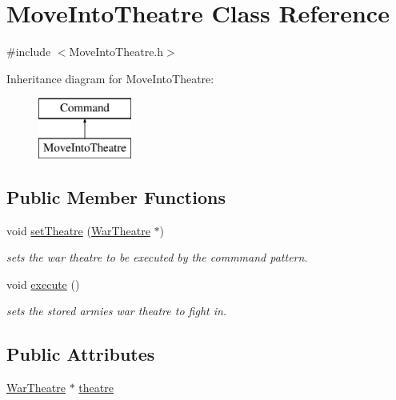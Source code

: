 \hypertarget{class_move_into_theatre}{}\section{Move\+Into\+Theatre Class Reference}
\label{class_move_into_theatre}


{\ttfamily \#include $<$Move\+Into\+Theatre.\+h$>$}

Inheritance diagram for Move\+Into\+Theatre\+:\begin{figure}[H]
\begin{center}
\leavevmode
\includegraphics[height=2.000000cm]{class_move_into_theatre}
\end{center}
\end{figure}
\subsection*{Public Member Functions}
\begin{DoxyCompactItemize}
\item 
void \mbox{\hyperlink{class_move_into_theatre_a656d80ebaa2184e0347273edb6cb5c4f}{set\+Theatre}} (\mbox{\hyperlink{class_war_theatre}{War\+Theatre}} $\ast$)
\begin{DoxyCompactList}\small\item\em sets the war theatre to be executed by the commmand pattern. \end{DoxyCompactList}\item 
void \mbox{\hyperlink{class_move_into_theatre_a4e708f54f8edabcb6be4164c1d38adcf}{execute}} ()
\begin{DoxyCompactList}\small\item\em sets the stored armies war theatre to fight in. \end{DoxyCompactList}\end{DoxyCompactItemize}
\subsection*{Public Attributes}
\begin{DoxyCompactItemize}
\item 
\mbox{\hyperlink{class_war_theatre}{War\+Theatre}} $\ast$ \mbox{\hyperlink{class_move_into_theatre_a40940d91b168d17242593044cfbf7397}{theatre}}
\end{DoxyCompactItemize}
